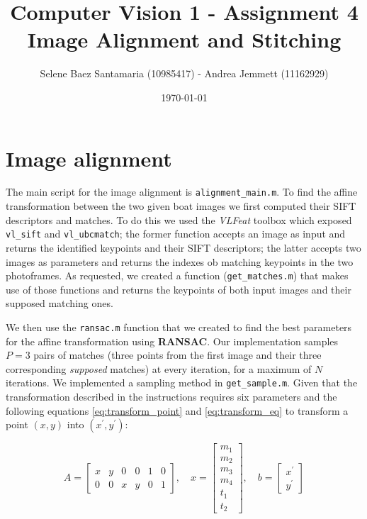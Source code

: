\documentclass[11pt]{article}
\title{
	{Computer Vision 1 - Assignment 4 \\
	Image Alignment and Stitching}
}
\author{
Selene Baez Santamaria (10985417) - Andrea Jemmett (11162929)}
\date{\today}
\begin{document}
\maketitle

\section{Image alignment}
The main script for the image alignment is \texttt{alignment\_main.m}. To find
the affine transformation between the two given boat images we first computed their SIFT
descriptors and matches. To do this we used the \textit{VLFeat} toolbox which
exposed \texttt{vl\_sift} and \texttt{vl\_ubcmatch}; the former function accepts
an image as input and returns the identified keypoints and their SIFT
descriptors; the latter accepts two images as parameters and returns the indexes
ob matching keypoints in the two photoframes. As requested, we created a
function (\texttt{get\_matches.m}) that makes use of those functions and returns
the keypoints of both input images and their supposed matching ones.

We then use the \texttt{ransac.m} function that we created to find the best
parameters for the affine transformation using \textbf{RANSAC}. Our
implementation samples $P = 3$ pairs of matches (three points from the first
image and their three corresponding \textit{supposed} matches) at every
iteration, for a maximum of $N$ iterations. We implemented a sampling method in
\texttt{get\_sample.m}. Given that the transformation described in the
instructions requires six parameters and the following equations
\ref{eq:transform_point} and \ref{eq:transform_eq} to transform a point $(x,y)$
into $(x^{\prime}, y^{\prime})$:

\begin{equation}
	\label{eq:transform_point}
	A =
	\begin{bmatrix}
		x & y & 0 & 0 & 1 & 0 \\
		0 & 0 & x & y & 0 & 1
	\end{bmatrix}
	,\quad
	x =
	\begin{bmatrix}
		m_1 \\ m_2 \\ m_3 \\ m_4 \\ t_1 \\ t_2
	\end{bmatrix}
	,\quad
	b =
	\begin{bmatrix}
		x^{\prime} \\ y^{\prime}
	\end{bmatrix}
\end{equation}
\end{document}
